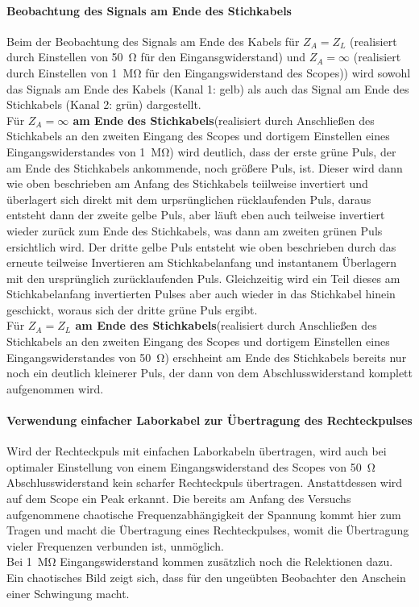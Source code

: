 \documentclass[a4paper,twoside,final]{article}
\begin{document}
\paragraph{Beobachtung des Signals am Ende des Stichkabels }
Beim der Beobachtung des Signals am Ende des Kabels für $Z_A = Z_L$ (realisiert durch Einstellen von \SI{50}{\ohm} für den Eingansgwiderstand) und $Z_A = \infty$ (realisiert durch Einstellen von \SI{1}{\mega\ohm} für den Eingangswiderstand des Scopes)) wird sowohl das Signals am Ende des Kabels (Kanal 1: gelb) als auch das Signal am Ende des Stichkabels (Kanal 2: grün) dargestellt.\\

Für \textbf{$Z_A = \infty$ am Ende des Stichkabels}(realisiert durch Anschließen des Stichkabels an den zweiten Eingang des Scopes und dortigem Einstellen eines Eingangswiderstandes von \SI{1}{\mega\ohm}) wird deutlich, dass der erste grüne Puls, der am Ende des Stichkabels ankommende, noch größere Puls, ist. Dieser wird dann wie oben beschrieben am Anfang des Stichkabels teiilweise invertiert und überlagert sich direkt mit dem urpsrünglichen rücklaufenden Puls, daraus entsteht dann der zweite gelbe Puls, aber läuft eben auch teilweise invertiert wieder zurück zum Ende des Stichkabels, was dann am zweiten grünen Puls ersichtlich wird. Der dritte gelbe Puls entsteht wie oben beschrieben durch das erneute teilweise Invertieren am Stichkabelanfang und instantanem Überlagern mit den ursprünglich zurücklaufenden Puls. Gleichzeitig wird ein Teil dieses am Stichkabelanfang invertierten Pulses aber auch wieder in das Stichkabel hinein geschickt, woraus sich der dritte grüne Puls ergibt. \\

Für \textbf{$Z_A = Z_L$ am Ende des Stichkabels}(realisiert durch Anschließen des Stichkabels an den zweiten Eingang des Scopes und dortigem Einstellen eines Eingangswiderstandes von \SI{50}{\ohm}) erschheint am Ende des Stichkabels bereits nur noch ein deutlich kleinerer Puls, der dann von dem Abschlusswiderstand komplett aufgenommen wird.\\

\paragraph{Verwendung einfacher Laborkabel zur Übertragung des Rechteckpulses}
Wird der Rechteckpuls mit einfachen Laborkabeln übertragen, wird auch bei optimaler Einstellung von einem Eingangswiderstand des Scopes von \SI{50}{\ohm} Abschlusswiderstand kein scharfer Rechteckpuls übertragen. Anstattdessen wird auf dem Scope ein Peak erkannt. Die bereits am Anfang des Versuchs aufgenommene chaotische Frequenzabhängigkeit der Spannung kommt hier zum Tragen und macht die Übertragung eines Rechteckpulses, womit die Übertragung vieler Frequenzen verbunden ist, unmöglich. \\
Bei \SI{1}{\mega\ohm} Eingangswiderstand kommen zusätzlich noch die Relektionen dazu. Ein chaotisches Bild zeigt sich, dass für den ungeübten Beobachter den Anschein einer Schwingung macht. \\
\end{document}

